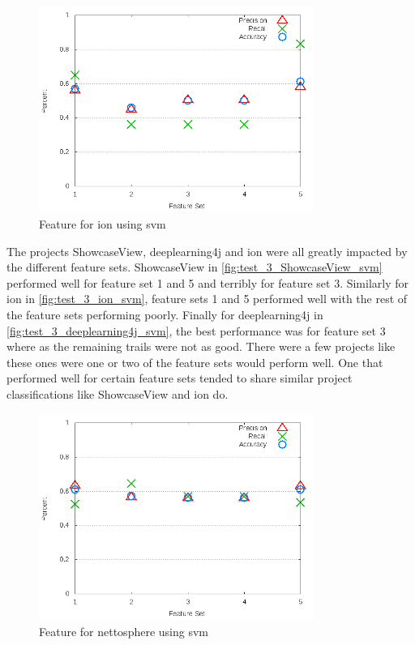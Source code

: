 \begin{figure}[!ht]
    \centering
        \includegraphics[width=0.8\textwidth]{images/svm/test_3/ion_sample_range}
        \caption{Feature for ion using \gls{svm}}
        \label{fig:test_3_ion_svm}
\end{figure}

The projects ShowcaseView, deeplearning4j and ion were all greatly impacted by the different feature sets. ShowcaseView in \autoref{fig:test_3_ShowcaseView_svm} performed well for feature set 1 and 5 and terribly for feature set 3. 
Similarly for ion in \autoref{fig:test_3_ion_svm}, feature sets 1 and 5 performed well with the rest of the feature sets performing poorly. Finally for deeplearning4j in \autoref{fig:test_3_deeplearning4j_svm}, the best performance was for feature set 3 where as the remaining trails were not as good. There were a few projects like these ones were one or two of the feature sets would perform well. One that performed well for certain feature sets tended to share similar project classifications like ShowcaseView and ion do.

\begin{figure}[!ht]
    \centering
        \includegraphics[width=0.8\textwidth]{images/svm/test_3/nettosphere_sample_range}
        \caption{Feature for nettosphere using \gls{svm}}
        \label{fig:test_3_nettosphere_svm}
\end{figure}

